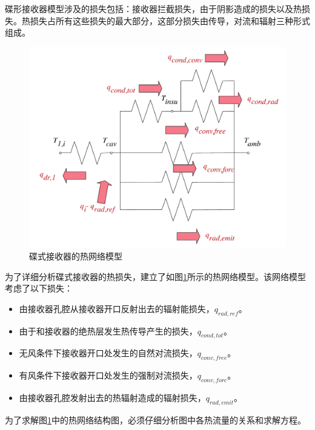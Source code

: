 碟形接收器模型涉及的损失包括：接收器拦截损失，由于阴影造成的损失以及热损失。热损失占所有这些损失的最大部分，这部分损失由传导，对流和辐射三种形式组成。
\noindent \begin{figure}[ht!]
\begin{center}
	\includegraphics[width = 0.5\columnwidth]{fig/thermalLosses.pdf}
	\caption{碟式接收器的热网络模型}
	\label{fig:thermal-lose}
\end{center}
\end{figure}
为了详细分析碟式接收器的热损失，建立了如图\ref{fig:thermal-lose}所示的热网络模型。该网络模型考虑了以下损失：
\begin{itemize}
	\item 由接收器孔腔从接收器开口反射出去的辐射能损失，$q_{rad,ref}$。
	\item 由于和接收器的绝热层发生热传导产生的损失，$q_{cond,tot}$。
	\item 无风条件下接收器开口处发生的自然对流损失，$q_{conv,free}$。
	\item 有风条件下接收器开口处发生的强制对流损失，$q_{conv,forc}$。
	\item 由接收器孔腔发射出去的热辐射造成的辐射损失，$q_{rad,emit}$。
\end{itemize}

为了求解图\ref{fig:thermal-lose}中的热网络结构图，必须仔细分析图中各热流量的关系和求解方程。

